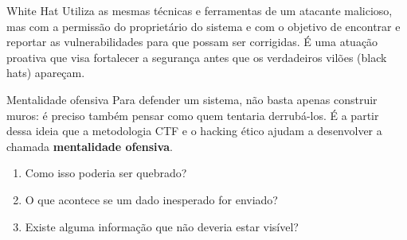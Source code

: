 \documentclass{if-beamer}
\begin{document}
	\begin{frame}{White Hat}
		Utiliza as mesmas técnicas e ferramentas de um atacante malicioso, mas com a permissão do proprietário
		do sistema e com o objetivo de encontrar e reportar as vulnerabilidades para que possam ser corrigidas.
		É uma atuação proativa que visa fortalecer a segurança antes que os verdadeiros vilões (black hats) apareçam.
	\end{frame}

	\begin{frame}{Mentalidade ofensiva}
		Para defender um sistema, não basta apenas construir muros: é preciso também pensar como quem tentaria derrubá-los.
		 É a partir dessa ideia que a metodologia CTF e o hacking ético ajudam a desenvolver a chamada \textbf{mentalidade ofensiva}.
		\begin{enumerate}
			\item Como isso poderia ser quebrado?
			\item O que acontece se um dado inesperado for enviado?
			\item Existe alguma informação que não deveria estar visível?
		\end{enumerate}
	\end{frame}
\end{document}
